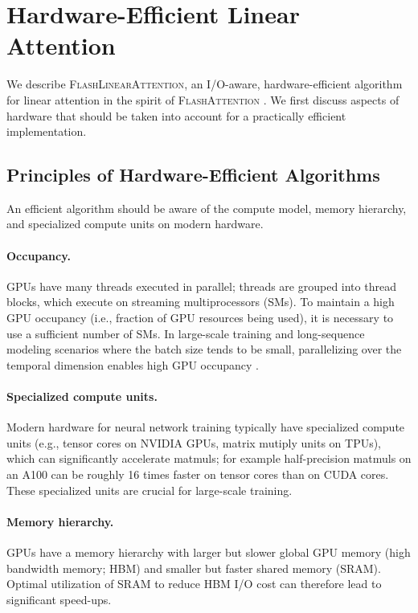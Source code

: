 \section{Hardware-Efficient Linear Attention}

\label{sec:algorithm}
We describe \textsc{FlashLinearAttention}, an I/O-aware, hardware-efficient algorithm for linear attention in the spirit of \textsc{FlashAttention} \cite{flashattention1,flashattention2}. We first discuss aspects of hardware that should be taken into account for a practically efficient implementation.

\subsection{Principles of Hardware-Efficient Algorithms}

 An efficient  algorithm should be aware of the compute model, memory hierarchy, and specialized compute units on modern hardware. 

\paragraph{Occupancy.} GPUs have many threads executed in parallel; threads are grouped into thread blocks, which execute on streaming multiprocessors (SMs). To maintain a high GPU occupancy (i.e., fraction of GPU resources being used), it is necessary to use a sufficient number of SMs. In large-scale training and long-sequence modeling scenarios where the batch size tends to be small, parallelizing over the temporal dimension enables high GPU occupancy \cite{flashattention2}. 

\paragraph{Specialized compute units.} Modern hardware for neural network training typically have specialized compute units (e.g., {tensor cores} on NVIDIA GPUs, matrix mutiply units on TPUs), which can significantly accelerate matmuls; for example half-precision matmuls on an A100 can be roughly 16 times faster on tensor cores than on CUDA cores. These specialized units are crucial for large-scale training.

\paragraph{Memory hierarchy.} GPUs have a memory hierarchy with larger but slower global GPU memory (high bandwidth memory; HBM) and smaller but faster shared memory (SRAM). Optimal utilization of SRAM to reduce HBM I/O cost can therefore lead to significant speed-ups.

